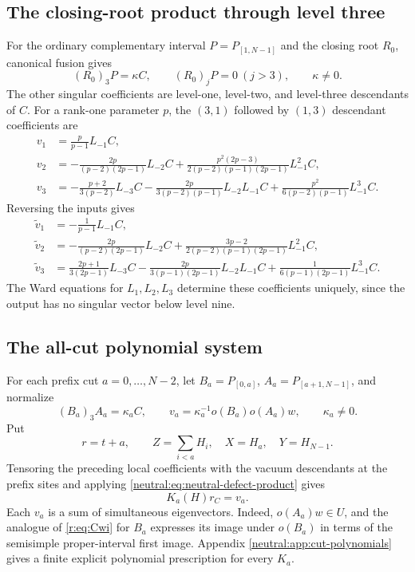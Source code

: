 \documentclass[11pt,a4paper]{article}
\numberwithin{equation}{section}
\theoremstyle{definition}\newtheorem{definition}[theorem]{Definition}
\theoremstyle{remark}\newtheorem{remark}[theorem]{Remark}
\begin{document}
\subsection{The closing-root product through level three}

For the ordinary complementary interval \(P=P_{[1,N-1]}\) and
the closing root \(R_0\), canonical fusion gives
\[
 (R_0)_3P=\kappa C,\qquad
 (R_0)_jP=0\ (j>3),\qquad \kappa\ne0.
\]
The other singular coefficients are level-one, level-two, and
level-three descendants of \(C\).
For a rank-one parameter \(p\), the \((3,1)\) followed by
\((1,3)\) descendant coefficients are
\begin{align*}
 v_1&=\frac p{p-1}L_{-1}C,\\
 v_2&=-\frac{2p}{(p-2)(2p-1)}L_{-2}C
       +\frac{p^2(2p-3)}{2(p-2)(p-1)(2p-1)}L_{-1}^2C,\\
 v_3&=-\frac{p+2}{3(p-2)}L_{-3}C
       -\frac{2p}{3(p-2)(p-1)}L_{-2}L_{-1}C
       +\frac{p^2}{6(p-2)(p-1)}L_{-1}^3C.
\end{align*}
Reversing the inputs gives
\begin{align*}
 \widetilde v_1&=-\frac1{p-1}L_{-1}C,\\
 \widetilde v_2&=-\frac{2p}{(p-2)(2p-1)}L_{-2}C
       +\frac{3p-2}{2(p-2)(p-1)(2p-1)}L_{-1}^2C,\\
 \widetilde v_3&=\frac{2p+1}{3(2p-1)}L_{-3}C
       -\frac{2p}{3(p-1)(2p-1)}L_{-2}L_{-1}C
       +\frac1{6(p-1)(2p-1)}L_{-1}^3C.
\end{align*}
The Ward equations for \(L_1,L_2,L_3\) determine these coefficients
uniquely, since the output has no singular vector below level nine.

\subsection{The all-cut polynomial system}

For each prefix cut \(a=0,\ldots,N-2\), let
\(B_a=P_{[0,a]}\), \(A_a=P_{[a+1,N-1]}\), and normalize
\[
 (B_a)_3A_a=\kappa_a C,\qquad
 v_a=\kappa_a^{-1}o(B_a)o(A_a)w,\qquad \kappa_a\ne0.
\]
Put
\[
 r=t+a,\qquad
 Z=\sum_{i<a}H_i,\quad X=H_a,\quad Y=H_{N-1}.
\]
Tensoring the preceding local coefficients with the vacuum
descendants at the prefix sites and applying \eqref{neutral:eq:neutral-defect-product}
gives
\begin{equation}\label{r:eq:K}
                        K_a(H)r_C=v_a.
\end{equation}
Each \(v_a\) is a sum of simultaneous eigenvectors.  Indeed,
\(o(A_a)w\in U\), and the analogue of \eqref{r:eq:Cwi} for \(B_a\)
expresses its image under \(o(B_a)\) in terms of the semisimple
proper-interval first image.
Appendix \ref{neutral:app:cut-polynomials} gives a finite explicit
polynomial prescription for every \(K_a\).
\end{document}
